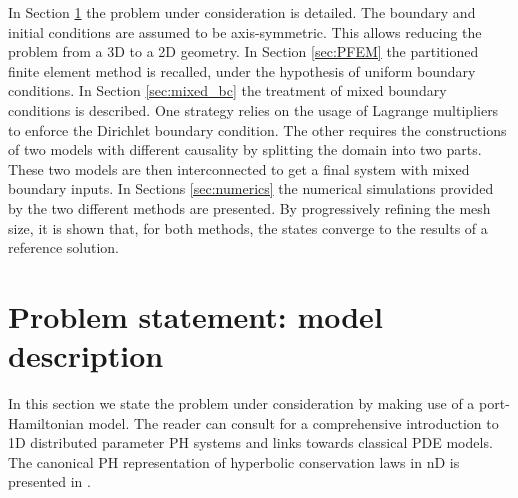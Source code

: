 \documentclass{ifacconf}
\begin{document}
In Section \ref{sec:model} the problem under consideration is detailed. The boundary and initial conditions are assumed to be axis-symmetric. This allows reducing the problem from a 3D to a 2D geometry. In Section \ref{sec:PFEM} the partitioned finite element method is recalled, under the hypothesis of uniform boundary conditions. In Section \ref{sec:mixed_bc} the treatment of mixed boundary conditions is described. One strategy relies on the usage of Lagrange multipliers to enforce the Dirichlet boundary condition. The other requires the constructions of two models with different causality by splitting the domain into two parts. These two models are then interconnected to get a final system with mixed boundary inputs. In Sections \ref{sec:numerics} the numerical simulations provided by the two different methods are presented. By progressively refining the mesh size, it is shown that, for both methods, the states converge to the results of a reference solution.

\section{Problem statement: model description}
\label{sec:model}
In this section we state the problem under consideration by making use of a port-Hamiltonian model. The reader can consult \cite{BookZwart} for a comprehensive introduction to 1D distributed parameter PH systems and links towards classical PDE models. The canonical PH representation of hyperbolic conservation laws in nD is presented in \cite{VANDERSCHAFT2002}.
\end{document}

